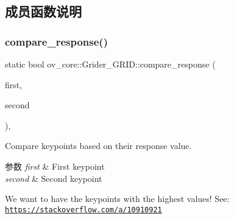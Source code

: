 \subsection{成员函数说明}
\mbox{\label{classov__core_1_1Grider__GRID_a6e78e323f7c99e2a13be240345c564f3}} 
\subsubsection{\texorpdfstring{compare\+\_\+response()}{compare\_response()}}
{\footnotesize\ttfamily static bool ov\+\_\+core\+::\+Grider\+\_\+\+G\+R\+I\+D\+::compare\+\_\+response (\begin{DoxyParamCaption}\item[{cv\+::\+Key\+Point}]{first,  }\item[{cv\+::\+Key\+Point}]{second }\end{DoxyParamCaption})\hspace{0.3cm}{\ttfamily [inline]}, {\ttfamily [static]}}



Compare keypoints based on their response value. 


\begin{DoxyParams}{参数}
{\em first} & First keypoint \\
\hline
{\em second} & Second keypoint\\
\hline
\end{DoxyParams}
We want to have the keypoints with the highest values! See\+: \href{https://stackoverflow.com/a/10910921}{\tt https\+://stackoverflow.\+com/a/10910921} \mbox{\label{classov__core_1_1Grider__GRID_a5021984f1ab36317c43ea3beddfd34e2}} 
